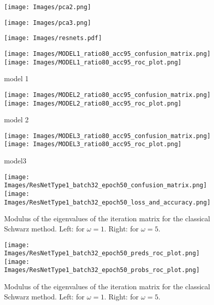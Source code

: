 \documentclass[a4paper,12pt]{article}
\begin{document}
\begin{figure}[H]
  \centering
  \texttt{[image: Images/pca2.png]}
\end{figure}

\begin{figure}[H]
  \centering
  \texttt{[image: Images/pca3.png]}
\end{figure}

\begin{figure}[H]
  \centering
  \texttt{[image: Images/resnets.pdf]}
\end{figure}


\begin{figure}[H]
  \centering
  \texttt{[image: Images/MODEL1\_ratio80\_acc95\_confusion\_matrix.png]} \qquad
  \texttt{[image: Images/MODEL1\_ratio80\_acc95\_roc\_plot.png]}
  \caption{model 1}
  \label{Fig1}
\end{figure}

\begin{figure}[H]
  \centering
  \texttt{[image: Images/MODEL2\_ratio80\_acc95\_confusion\_matrix.png]} \qquad
  \texttt{[image: Images/MODEL2\_ratio80\_acc95\_roc\_plot.png]}
  \caption{model 2}
  \label{Fig2}
\end{figure}


\begin{figure}[H]
  \centering
  \texttt{[image: Images/MODEL3\_ratio80\_acc95\_confusion\_matrix.png]} \qquad
  \texttt{[image: Images/MODEL3\_ratio80\_acc95\_roc\_plot.png]}
  \caption{model3}
  \label{Fig3}
\end{figure}


\begin{figure}[H]
  \centering
  \texttt{[image: Images/ResNetType1\_batch32\_epoch50\_confusion\_matrix.png]} \qquad
  \texttt{[image: Images/ResNetType1\_batch32\_epoch50\_loss\_and\_accuracy.png]}
  \caption{Modulus of the eigenvalues of the iteration matrix for the 
  classical Schwarz method. Left: for $\omega=1$. Right: for $\omega=5$.}
\end{figure}


\begin{figure}[H]
  \centering
  \texttt{[image: Images/ResNetType1\_batch32\_epoch50\_preds\_roc\_plot.png]} \qquad
  \texttt{[image: Images/ResNetType1\_batch32\_epoch50\_probs\_roc\_plot.png]}
  \caption{Modulus of the eigenvalues of the iteration matrix for the 
  classical Schwarz method. Left: for $\omega=1$. Right: for $\omega=5$.}
\end{figure}
\end{document}
